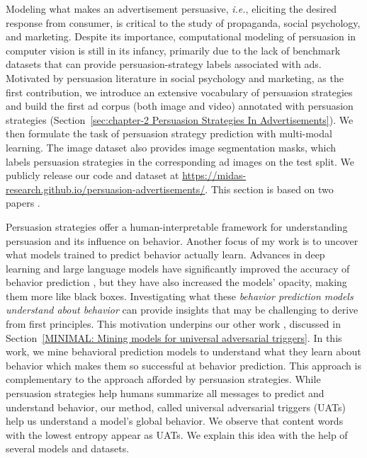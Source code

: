 Modeling what makes an advertisement persuasive, \textit{i.e.}, eliciting the desired response from consumer, is critical to the study of propaganda, social psychology, and marketing. Despite its importance, computational modeling of persuasion in computer vision is still in its infancy, primarily due to the lack of benchmark datasets that can provide persuasion-strategy labels associated with ads. Motivated by persuasion literature in social psychology and marketing, as the first contribution, we introduce an extensive vocabulary of persuasion strategies and build the first ad corpus (both image and video) annotated with persuasion strategies (Section~\ref{sec:chapter-2 Persuasion Strategies In Advertisements}). We then formulate the task of persuasion strategy prediction with multi-modal learning. The image dataset also provides image segmentation masks, which labels persuasion strategies in the corresponding ad images on the test split. We publicly release our code and dataset at \url{https://midas-research.github.io/persuasion-advertisements/}. This section is based on two papers \cite{kumar2023persuasion,bhattacharya2023video}.


Persuasion strategies offer a human-interpretable framework for understanding persuasion and its influence on behavior. Another focus of my work is to uncover what models trained to predict behavior actually learn. Advances in deep learning and large language models have significantly improved the accuracy of behavior prediction \cite{khandelwal2023large}, but they have also increased the models' opacity, making them more like black boxes. Investigating what these \textit{behavior prediction models understand about behavior} can provide insights that may be challenging to derive from first principles. This motivation underpins our other work \cite{singla2022minimal}, discussed in Section~\ref{MINIMAL: Mining models for universal adversarial triggers}. In this work, we mine behavioral prediction models to understand what they learn about behavior which makes them so successful at behavior prediction. This approach is complementary to the approach afforded by persuasion strategies. While persuasion strategies help humans summarize all messages to predict and understand behavior, our method, called universal adversarial triggers (UATs) help us understand a model's global behavior. We observe that content words with the lowest entropy appear as UATs. We explain this idea with the help of several models and datasets.



